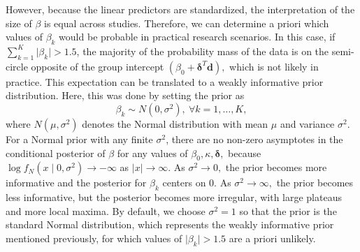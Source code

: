 \documentclass[11pt,a4paper]{article}\usepackage[]{graphicx}\usepackage[]{color}
\newcommand{\bd}{\boldsymbol{d}}
\newcommand{\bdt}{\boldsymbol{\delta}}
\begin{document}
However, because the linear predictors are standardized, the interpretation of the size of \( \beta \) is equal across studies. Therefore, we can determine a priori which values of \( \beta_k \) would be probable in practical research scenarios. In this case, if \( \sum_{k=1}^K \vert \beta_k \vert > 1.5 \), the majority of the probability mass of the data is on the semi-circle opposite of the group intercept \( (\beta_0 + \bdt^T \bd),\) which is not likely in practice. This expectation can be translated to a weakly informative prior distribution. Here, this was done by setting the prior as
\begin{equation}
\beta_k \sim N(0, \sigma^2), ~ \forall k = 1, \dots, K,
\end{equation}
 where \( N(\mu, \sigma^2) \) denotes the Normal distribution with mean \( \mu \) and variance \( \sigma^2\). For a Normal prior with any finite \(\sigma^2\), there are no non-zero asymptotes in the conditional posterior of \(\beta\) for any values of \(\beta_0, \kappa, \boldsymbol{\delta},\) because \(\log f_N(x \mid 0, \sigma^2) \rightarrow -\infty\) as \(\vert x \vert \rightarrow \infty.\) As \( \sigma^2 \rightarrow 0,\) the prior becomes more informative and the posterior for \( \beta_k \) centers on 0. As \( \sigma^2 \rightarrow \infty,\) the prior becomes less informative, but the posterior becomes more irregular, with large plateaus and more local maxima.   By default, we choose \( \sigma^2 = 1\) so that the prior is the standard Normal distribution, which represents the weakly informative prior mentioned previously, for which values of \( \vert\beta_k\vert > 1.5 \) are a priori unlikely.
\end{document}
